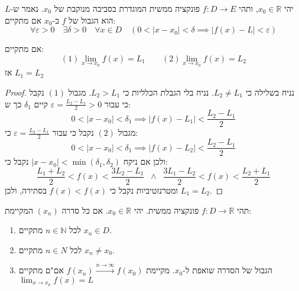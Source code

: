 \documentclass{tstextbook}
\begin{document}
\begin{definition}
יהי \(x_{0} \in \mathbb{R}\), ותהי \(f:D\to E\) פונקציה ממשית המוגדרת בסביבה מנוקבת של \(x_{0}\). נאמר ש-\(L\) הוא הגבול של \(f\) ב-\(x_{0}\) אם מתקיים:
$$\forall \varepsilon>0\quad \exists \delta > 0\quad  \forall x \in D\quad \left( 0<\lvert x-x_{0} \rvert <\delta\implies \lvert f(x)-L \rvert <\varepsilon \right)$$

\end{definition}
\begin{proposition}
אם מתקיים:
$$(1)\lim_{ x \to x_{0} } f(x)=L_{1}\qquad (2)\lim_{ x \to x_{0} } f(x)=L_{2}$$
אז \(L_{1}=L_{2}\)

\end{proposition}
\begin{proof}
נניח בשלילה כי \(L_{2}\neq L_{1}\). נניח בלי הגבלת הכלליות כי \(L_{2} > L_{1}\). מגבול \((1)\) נקבל כי עבור \(\varepsilon=\frac{L_{2}-L_{1}}{2}>0\) קיים \(\delta_{1}\) כך ש:
$$0<\lvert x-x_{0} \rvert <\delta_{1}\implies \lvert f(x)-L_{1} \rvert < \frac{L_{2}-L_{1}}{2}$$
מגבול \((2)\) נקבל כי עבור \(\varepsilon=\frac{L_{2}-L_{1}}{2}\) כי:
$$0<\lvert x - x_{0} \rvert <\delta_{1}\implies \lvert f(x)-L_{2} \rvert < \frac{L_{2}-L_{1}}{2}$$
ולכן אם ניקח \(\lvert x-x_{0} \rvert<\min\left( \delta_{1},\delta_{2} \right)\) נקבל כי:
$$\frac{L_{1}+L_{2}}{2}<f(x)<\frac{3L_{2}-L_{1}}{2}\;\;\land \;\;\frac{3L_{1}-L_{2}}{2}<f(x)<\frac{L_{2}+L_{1}}{2}$$
ומטרנזטיביות נקבל כי \(f(x)<f(x)\) בסתירה, ולכן \(L_{1}=L_{2}\).

\end{proof}
\begin{proposition}
תהי \(f:D\to \mathbb{R}\) פונקציה ממשית. יהי \(x_{0} \in \mathbb{R}\). אם כל סדרה \((x_{n})\) המקיימת:

  \begin{enumerate}
    \item לכל \(n \in \mathbb{N}\) מתקיים \(x_{n}\in D\). 


    \item לכל \(n \in N\) מתקיים \(x_{n} \neq x_{0}\). 


    \item הגבול של הסדרה שואפת ל-\(x_{0}\). 
מקיימת \(f(x_{n})\xrightarrow{n\to \infty}f(x_{0})\) אם"ם מתקיים \(\lim_{ x \to x_{0} }f(x)=L\)


  \end{enumerate}
\end{proposition}
\end{document}
